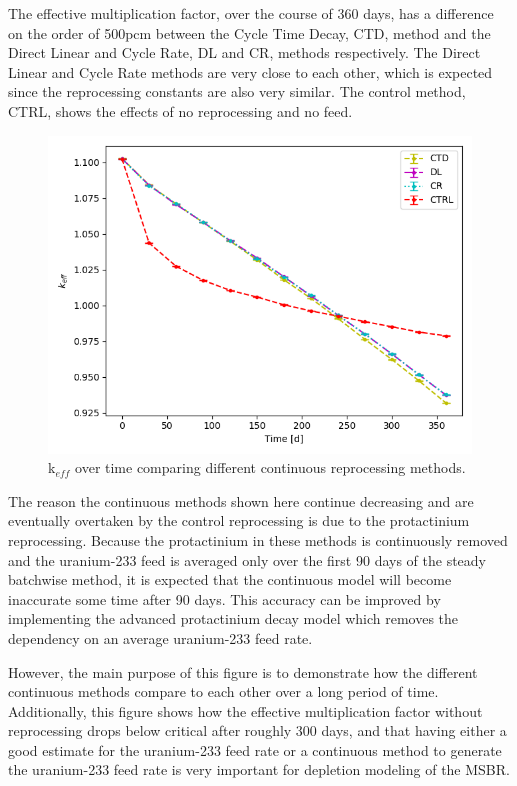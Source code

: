 The effective multiplication factor, over the course of 360 days, has a difference on the order of 500pcm between the Cycle Time Decay, CTD, method and the Direct Linear and Cycle Rate, DL and CR, methods respectively. The Direct Linear and Cycle Rate methods are very close to each other, which is expected since the reprocessing constants are also very similar. The control method, CTRL, shows the effects of no reprocessing and no feed.

\begin{figure}[H]
  \centering
  \includegraphics[scale=0.7]{images/cont-compare-keff-1.png}
  \caption{k$_{eff}$ over time comparing different continuous reprocessing methods.}
   \label{fig:continuous-compare}
\end{figure}

The reason the continuous methods shown here continue decreasing and are eventually overtaken by the control reprocessing is due to the protactinium reprocessing. Because the protactinium in these methods is continuously removed and the uranium-233 feed is averaged only over the first 90 days of the steady batchwise method, it is expected that the continuous model will become inaccurate some time after 90 days. This accuracy can be improved by implementing the advanced protactinium decay model which removes the dependency on an average uranium-233 feed rate.

However, the main purpose of this figure is to demonstrate how the different continuous methods compare to each other over a long period of time. Additionally, this figure shows how the effective multiplication factor without reprocessing drops below critical after roughly 300 days, and that having either a good estimate for the uranium-233 feed rate or a continuous method to generate the uranium-233 feed rate is very important for depletion modeling of the MSBR.


